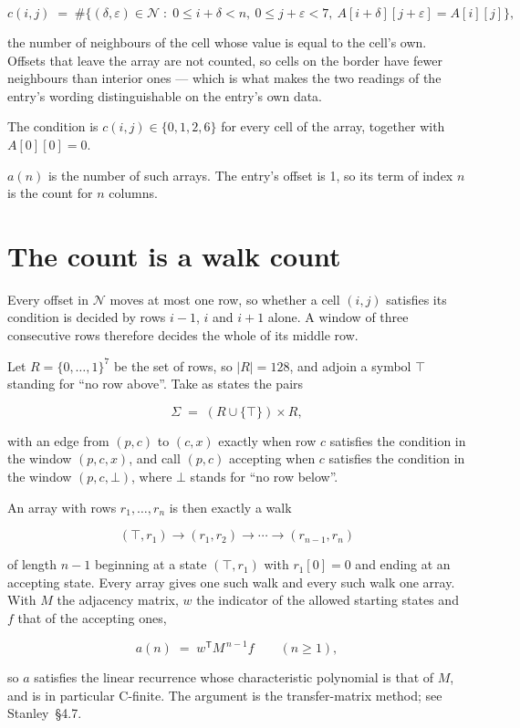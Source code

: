 \documentclass[11pt]{article}
\theoremstyle{definition}
\begin{document}
\[c(i,j) \;=\; \#\bigl\{(\delta,\varepsilon)\in\mathcal{N} \;:\; 0\le i+\delta<n,\ 0\le j+\varepsilon<7,\ A[i+\delta][j+\varepsilon] = A[i][j]\bigr\},\]

the number of neighbours of the cell whose value is equal to the cell's own. Offsets that leave the array are not counted, so cells on the border have fewer neighbours than interior ones --- which is what makes the two readings of the entry's wording distinguishable on the entry's own data.

The condition is $c(i,j) \in \{0, 1, 2, 6\}$ for every cell of the array, together with $A[0][0]=0$.

$a(n)$ is the number of such arrays. The entry's offset is 1, so its term of index $n$ is the count for $n$ columns.

\section{The count is a walk count}

Every offset in $\mathcal{N}$ moves at most one row, so whether a cell $(i,j)$ satisfies its condition is decided by rows $i-1$, $i$ and $i+1$ alone. A window of three consecutive rows therefore decides the whole of its middle row.

Let $R = \{0,\dots,1\}^{7}$ be the set of rows, so $|R| = 128$, and adjoin a symbol $\top$ standing for ``no row above''. Take as states the pairs

\[\Sigma \;=\; (R \cup \{\top\}) \times R,\]

with an edge from $(p,c)$ to $(c,x)$ exactly when row $c$ satisfies the condition in the window $(p,c,x)$, and call $(p,c)$ accepting when $c$ satisfies the condition in the window $(p,c,\bot)$, where $\bot$ stands for ``no row below''.

An array with rows $r_1,\dots,r_n$ is then exactly a walk

\[(\top,r_1) \to (r_1,r_2) \to \cdots \to (r_{n-1},r_n)\]

of length $n-1$ beginning at a state $(\top,r_1)$ with $r_1[0]=0$ and ending at an accepting state. Every array gives one such walk and every such walk one array. With $M$ the adjacency matrix, $w$ the indicator of the allowed starting states and $f$ that of the accepting ones,

\[a(n) \;=\; w^{\mathsf T} M^{\,n-1} f \qquad (n \ge 1),\]

so $a$ satisfies the linear recurrence whose characteristic polynomial is that of $M$, and is in particular C-finite. The argument is the transfer-matrix method; see Stanley~\S4.7.
\end{document}
